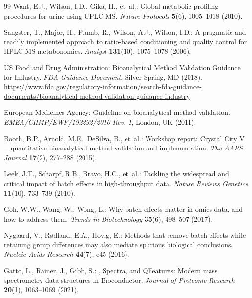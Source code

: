 \documentclass[11pt,twoside,openright]{book}
\begin{document}
\begin{thebibliography}{99}
Want, E.J., Wilson, I.D., Gika, H., et~al.:
\newblock Global metabolic profiling procedures for urine using {UPLC-MS}.
\newblock \emph{Nature Protocols} \textbf{5}(6), 1005--1018 (2010).
\newblock {}

Sangster, T., Major, H., Plumb, R., Wilson, A.J., Wilson, I.D.:
\newblock A pragmatic and readily implemented approach to ratio-based conditioning and quality control for {HPLC-MS} metabonomics.
\newblock \emph{Analyst} \textbf{131}(10), 1075--1078 (2006).
\newblock {}

US Food and Drug Administration:
\newblock Bioanalytical Method Validation Guidance for Industry.
\newblock \emph{FDA Guidance Document}, Silver Spring, MD (2018).
\newblock \url{https://www.fda.gov/regulatory-information/search-fda-guidance-documents/bioanalytical-method-validation-guidance-industry}

European Medicines Agency:
\newblock Guideline on bioanalytical method validation.
\newblock \emph{EMEA/CHMP/EWP/192292/2010 Rev. 1}, London, UK (2011).

Booth, B.P., Arnold, M.E., DeSilva, B., et~al.:
\newblock Workshop report: {Crystal City V}---quantitative bioanalytical method validation and implementation.
\newblock \emph{The AAPS Journal} \textbf{17}(2), 277--288 (2015).
\newblock {}

Leek, J.T., Scharpf, R.B., Bravo, H.C., et~al.:
\newblock Tackling the widespread and critical impact of batch effects in high-throughput data.
\newblock \emph{Nature Reviews Genetics} \textbf{11}(10), 733--739 (2010).
\newblock {}

Goh, W.W., Wang, W., Wong, L.:
\newblock Why batch effects matter in omics data, and how to address them.
\newblock \emph{Trends in Biotechnology} \textbf{35}(6), 498--507 (2017).
\newblock {}

Nygaard, V., R{\o}dland, E.A., Hovig, E.:
\newblock Methods that remove batch effects while retaining group differences may also mediate spurious biological conclusions.
\newblock \emph{Nucleic Acids Research} \textbf{44}(7), e45 (2016).
\newblock {}

Gatto, L., Rainer, J., Gibb, S.:
, {Spectra}, and {QFeatures}: Modern mass spectrometry data structures in {Bioconductor}.
\newblock \emph{Journal of Proteome Research} \textbf{20}(1), 1063--1069 (2021).
\newblock {}


\end{thebibliography}
\end{document}
